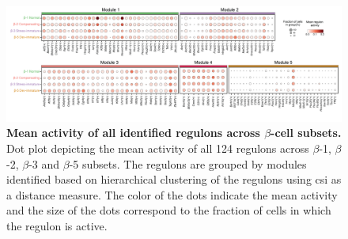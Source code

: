 \begin{figure}[H]
\centering
\includegraphics[width=\linewidth]{Appendix2/Fig/F3-18-01.png}
\caption[Mean activity of all identified regulons across $\beta$-cell subsets]{\textbf{Mean activity of all identified regulons across $\beta$-cell subsets.} Dot plot depicting the mean activity of all 124 regulons across $\beta$-1, $\beta$-2, $\beta$-3 and $\beta$-5 subsets. The regulons are grouped by modules identified based on hierarchical clustering of the regulons using \gls{csi} as a distance measure. The color of the dots indicate the mean activity and the size of the dots correspond to the fraction of cells in which the regulon is active.}
\label{fig:app_chp3_scenic_betasubsets}
\end{figure}








